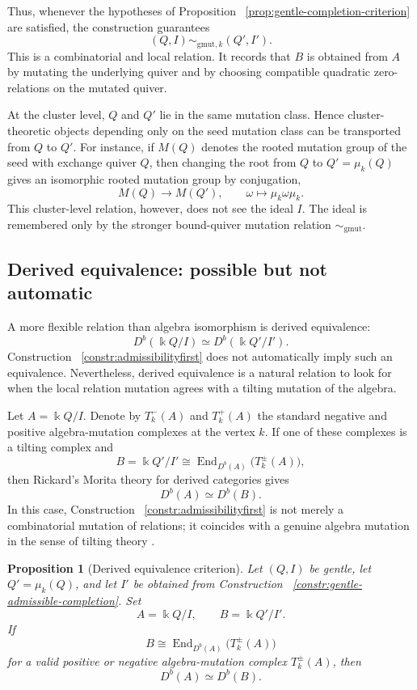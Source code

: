\documentclass[11pt]{article}
\newcommand{\K}{\Bbbk}
\theoremstyle{plain}
\newtheorem{proposition}[theorem]{Proposition}
\theoremstyle{definition}
\theoremstyle{remark}
\begin{document}
Thus, whenever the hypotheses of Proposition ~\ref{prop:gentle-completion-criterion} are satisfied,
the construction guarantees
\[
  (Q,I)\sim_{\mathrm{gmut},k}(Q',I').
\]
This is a combinatorial and local relation.  It records that \(B\) is obtained
from \(A\) by mutating the underlying quiver and by choosing compatible
quadratic zero-relations on the mutated quiver.

At the cluster level, \(Q\) and \(Q'\) lie in the same mutation class.  Hence
cluster-theoretic objects depending only on the seed mutation class can be
transported from \(Q\) to \(Q'\).  For instance, if \(M(Q)\) denotes the rooted
mutation group of the seed with exchange quiver \(Q\), then changing the root
from \(Q\) to \(Q'=\mu_k(Q)\) gives an isomorphic rooted mutation group by
conjugation,
\[
  M(Q)\longrightarrow M(Q'),
  \qquad
  \omega\longmapsto \mu_k\omega\mu_k.
\]
This cluster-level relation, however, does not see the ideal \(I\).  The ideal
is remembered only by the stronger bound-quiver mutation relation
\(\sim_{\mathrm{gmut}}\).

\subsection{Derived equivalence: possible but not automatic}

A more flexible relation than algebra isomorphism is derived equivalence:
\[
  D^b(\K Q/I)\simeq D^b(\K Q'/I').
\]
Construction ~\ref{constr:admissibilityfirst}  does not automatically imply such
an equivalence.  Nevertheless, derived equivalence is a natural relation to
look for when the local relation mutation agrees with a tilting mutation of the
algebra.

Let \(A=\K Q/I\).  Denote by \(T_k^-(A)\) and \(T_k^+(A)\) the standard
negative and positive algebra-mutation complexes at the vertex \(k\).  If one
of these complexes is a tilting complex and
\[
  B=\K Q'/I'
  \cong
  \operatorname{End}_{D^b(A)}\bigl(T_k^\pm(A)\bigr),
\]
then Rickard's Morita theory for derived categories gives
\[
  D^b(A)\simeq D^b(B).
\]
In this case,  Construction ~\ref{constr:admissibilityfirst}  is not merely a
combinatorial mutation of relations; it coincides with a genuine algebra
mutation in the sense of tilting theory \cite{LadkaniMutation}.

\begin{proposition}[Derived equivalence criterion]
Let \((Q,I)\) be gentle, let \(Q'=\mu_k(Q)\), and let \(I'\) be obtained from
Construction ~\ref{constr:gentle-admissible-completion}.  Set
\[
  A=\K Q/I,
  \qquad
  B=\K Q'/I'.
\]
If
\[
  B\cong \operatorname{End}_{D^b(A)}\bigl(T_k^\pm(A)\bigr)
\]
for a valid positive or negative algebra-mutation complex \(T_k^\pm(A)\), then
\[
  D^b(A)\simeq D^b(B).
\]
\end{proposition}
\end{document}
